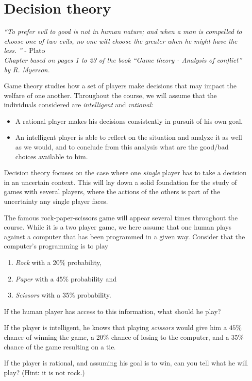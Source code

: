 \ifx \globalmark \undefined %
		


\else 
	
\fi



\chapter{Decision theory}
{\large{\itshape
``To prefer evil to good is not in human nature; and when a man is compelled to choose one of two evils, no one will choose the greater when he might have the less.
''} - Plato\\
}
{\small{\itshape
Chapter based on pages 1 to 23 of the book  ``Game theory - Analysis of conflict'' by R. Myerson.}\\
}
\label{chap:Decision}



Game theory studies how a set of players make decisions that may impact the welfare of one another.  
Throughout the course, we will assume that the individuals considered are \emph{intelligent} and \emph{rational}:
\begin{itemize}
\item A rational player makes his decisions consistently in pursuit of his own goal.
\item An intelligent player is able to reflect on the situation and analyze it as well as we would, and to conclude from this analysis what are the good/bad choices available to him.
\end{itemize} 
Decision theory focuses on the case where one \emph{single} player has to take a decision in an uncertain context. This will lay down a solid foundation for the study of games with several players, where the actions of the others is part of the uncertainty any single player faces. 

\begin{example}
\label{ch1:ex1}
The famous rock-paper-scissors game will appear several times throughout the course. While it is a two player game, we here assume that one human plays against a computer that has been programmed in a given way.
Consider that the computer's programming is to play
\begin{enumerate}
\item \emph{Rock} with a 20\% probability,
\item \emph{Paper} with a 45\% probability and
\item \emph{Scissors} with a 35\% probability.
\end{enumerate} 
If the human player has access to this information, what should he play?

If the player is intelligent, he knows that playing \emph{scissors} would give him a $45\%$ chance of winning the game, a $20\%$ chance of losing to the computer, and a $35\%$ chance of the game resulting on a tie.

If the player is rational, and assuming his goal is to win, can you tell what he will play? (Hint: it is not rock.)
\end{example}

